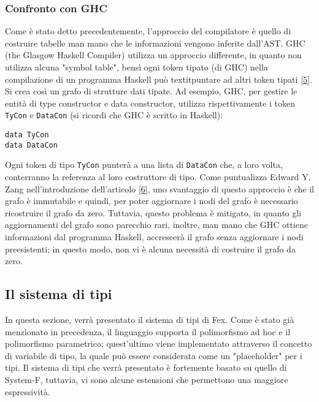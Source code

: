 \documentclass[10pt,a4paper]{article}
\begin{document}
\hypertarget{Confronto con GHC}{\subsubsection{Confronto con GHC}}
Come è stato detto precedentemente, l'approccio del compilatore è quello di costruire tabelle man mano che le informazioni
vengono inferite dall'AST. GHC (the Glasgow Haskell Compiler) utilizza un approccio differente, in quanto non utilizza
alcuna "symbol table", bensì ogni token tipato (di GHC) nella compilazione di un programma Haskell può
textit{puntare} ad altri token tipati \hyperlink{bibl5}{[5]}. Si crea così un grafo di strutture dati tipate.
Ad esempio, GHC, per gestire
le entità di type constructor e data constructor, utilizza rispettivamente i token \texttt{TyCon} e \texttt{DataCon} (si
ricordi che GHC è scritto in Haskell):
\begin{lstlisting}
data TyCon
data DataCon
\end{lstlisting}
Ogni token di tipo \texttt{TyCon} punterà a una lista di \texttt{DataCon} che, a loro volta, conterranno la referenza
al loro costruttore di tipo. Come puntualizza Edward Y. Zang nell'introduzione dell'articolo \hyperlink{bibl6}{[6]},
uno svantaggio di questo approccio è che il grafo è immutabile e quindi, per poter
aggiornare i nodi del grafo è necessario ricostruire il grafo da zero. Tuttavia, questo problema è mitigato, in quanto
gli aggiornamenti del grafo sono parecchio rari, inoltre, man mano che GHC ottiene informazioni dal programma Haskell,
accrescerà il grafo senza aggiornare i nodi preesistenti; in questo modo, non vi è alcuna necessità di costruire il
grafo da zero.

\hypertarget{Il sistema di tipi}{\subsection{Il sistema di tipi}}
In questa sezione, verrà presentato il sistema di tipi di Fex. Come è stato già menzionato in precedenza, il
linguaggio supporta il polimorfismo ad hoc e il polimorfismo parametrico; quest'ultimo viene implementato attraverso
il concetto di variabile di tipo, la quale può essere considerata come un "placeholder" per i tipi. Il sistema di tipi
che verrà presentato è fortemente basato su quello di System-F, tuttavia, vi sono alcune estensioni che permettono una
maggiore espressività.
\end{document}

